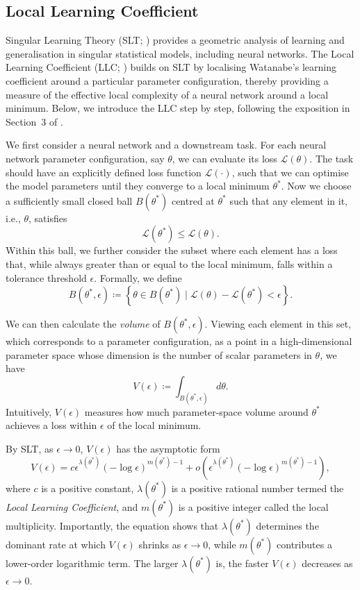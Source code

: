 \subsection{Local Learning Coefficient}
\label{app:slt}

Singular Learning Theory (SLT; ) provides a geometric analysis of learning and generalisation in singular statistical models, including neural networks. The Local Learning Coefficient (LLC; ) builds on SLT by localising Watanabe's learning coefficient around a particular parameter configuration, thereby providing a measure of the effective local complexity of a neural network around a local minimum. Below, we introduce the LLC step by step, following the exposition in Section~3 of .

We first consider a neural network and a downstream task. For each neural network parameter configuration, say $\theta$, we can evaluate its loss $\mathcal{L}(\theta)$. The task should have an explicitly defined loss function $\mathcal{L}(\cdot)$, such that we can optimise the model parameters until they converge to a local minimum $\theta^*$. Now we choose a sufficiently small closed ball $B(\theta^*)$ centred at $\theta^*$ such that any element in it, i.e., $\theta$, satisfies
\[
\mathcal{L}(\theta^*) \leq \mathcal{L}(\theta).
\]
Within this ball, we further consider the subset where each element has a loss that, while always greater than or equal to the local minimum, falls within a tolerance threshold $\epsilon$. Formally, we define
\[
B(\theta^*, \epsilon)
\coloneqq
\left\{
\theta \in B(\theta^*)
\mid
\mathcal{L}(\theta) - \mathcal{L}(\theta^*) < \epsilon
\right\}.
\]

We can then calculate the \emph{volume} of $B(\theta^*, \epsilon)$. Viewing each element in this set, which corresponds to a parameter configuration, as a point in a high-dimensional parameter space whose dimension is the number of scalar parameters in $\theta$, we have
\[
V(\epsilon)
\coloneqq
\int_{B(\theta^*, \epsilon)} d\theta.
\]
Intuitively, $V(\epsilon)$ measures how much parameter-space volume around $\theta^*$ achieves a loss within $\epsilon$ of the local minimum.

By SLT, as $\epsilon \to 0$, $V(\epsilon)$ has the asymptotic form
\[
V(\epsilon)
=
c\epsilon^{\lambda(\theta^*)}
(-\log\epsilon)^{m(\theta^*)-1}
+
o\!\left(
\epsilon^{\lambda(\theta^*)}
(-\log\epsilon)^{m(\theta^*)-1}
\right),
\]
where $c$ is a positive constant, $\lambda(\theta^*)$ is a positive rational number termed the \emph{Local Learning Coefficient}, and $m(\theta^*)$ is a positive integer called the local multiplicity. Importantly, the equation shows that $\lambda(\theta^*)$ determines the dominant rate at which $V(\epsilon)$ shrinks as $\epsilon \to 0$, while $m(\theta^*)$ contributes a lower-order logarithmic term. The larger $\lambda(\theta^*)$ is, the faster $V(\epsilon)$ decreases as $\epsilon \to 0$.

